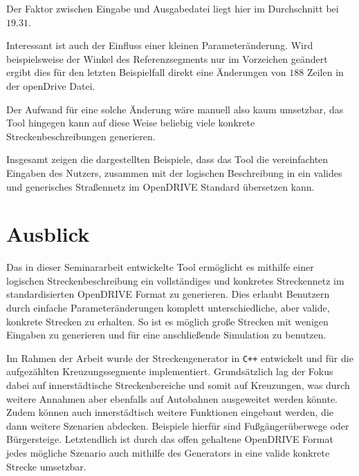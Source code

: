 Der Faktor zwischen Eingabe und Ausgabedatei liegt hier im Durchschnitt bei \(19.31\).

Interessant ist auch der Einfluss einer kleinen Parameteränderung. Wird beispielsweise der Winkel des Referenzsegments nur im Vorzeichen geändert ergibt dies für den letzten Beispielfall direkt eine Änderungen von \(188\) Zeilen in der openDrive Datei.

Der Aufwand für eine solche Änderung wäre manuell also kaum umsetzbar, das Tool hingegen kann auf diese Weise beliebig viele konkrete Streckenbeschreibungen generieren.

Insgesamt zeigen die dargestellten Beispiele, dass das Tool die vereinfachten Eingaben des Nutzers, zusammen mit der logischen Beschreibung in ein valides und generisches Straßennetz im OpenDRIVE Standard übersetzen kann.

\chapter{Ausblick}

Das in dieser Seminararbeit entwickelte Tool ermöglicht es mithilfe einer logischen Streckenbeschreibung ein vollständiges und konkretes Streckennetz im standardisierten OpenDRIVE Format zu generieren. Dies erlaubt Benutzern durch einfache Parameteränderungen komplett unterschiedliche, aber valide, konkrete Strecken zu erhalten. So ist es möglich große Strecken mit wenigen Eingaben zu generieren und für eine anschließende Simulation zu benutzen.

Im Rahmen der Arbeit wurde der Streckengenerator in \texttt{C++} entwickelt und für die aufgezählten Kreuzungssegmente implementiert. Grundsätzlich lag der Fokus dabei auf innerstädtische Streckenbereiche und somit auf Kreuzungen, was durch weitere Annahmen aber ebenfalls auf Autobahnen ausgeweitet werden könnte. Zudem können auch innerstädtisch weitere Funktionen eingebaut werden, die dann weitere Szenarien abdecken. Beispiele hierfür sind Fußgängerüberwege oder Bürgersteige. Letztendlich ist durch das offen gehaltene OpenDRIVE Format jedes mögliche Szenario auch mithilfe des Generators in eine valide konkrete Strecke umsetzbar.
